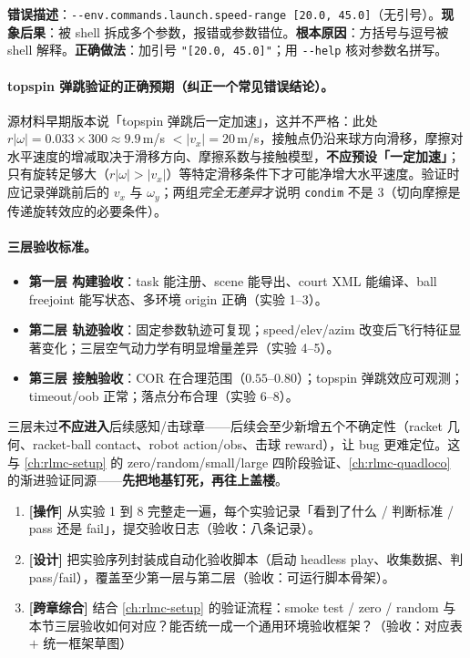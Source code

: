 \begin{pitfall}
\textbf{错误描述}：\verb|--env.commands.launch.speed-range [20.0, 45.0]|（无引号）。\textbf{现象后果}：被 shell 拆成多个参数，报错或参数错位。\textbf{根本原因}：方括号与逗号被 shell 解释。\textbf{正确做法}：加引号 \verb|"[20.0, 45.0]"|；用 \verb|--help| 核对参数名拼写。
\end{pitfall}

\paragraph{topspin 弹跳验证的正确预期（纠正一个常见错误结论）。}源材料早期版本说「topspin 弹跳后一定加速」，这并不严格：此处 $r|\omega|=0.033\times300\approx9.9$\,m/s $<|v_x|=20$\,m/s，接触点仍沿来球方向滑移，摩擦对水平速度的增减取决于滑移方向、摩擦系数与接触模型，\textbf{不应预设「一定加速」}；只有旋转足够大（$r|\omega|>|v_x|$）等特定滑移条件下才可能净增大水平速度。验证时应记录弹跳前后的 $v_x$ 与 $\omega_y$；两组\emph{完全无差异}才说明 \verb|condim| 不是 $3$（切向摩擦是传递旋转效应的必要条件）。

\paragraph{三层验收标准。}
\begin{itemize}
  \item \textbf{第一层 构建验收}：task 能注册、scene 能导出、court XML 能编译、ball freejoint 能写状态、多环境 origin 正确（实验 1--3）。
  \item \textbf{第二层 轨迹验收}：固定参数轨迹可复现；speed/elev/azim 改变后飞行特征显著变化；三层空气动力学有明显增量差异（实验 4--5）。
  \item \textbf{第三层 接触验收}：COR 在合理范围（$0.55$--$0.80$）；topspin 弹跳效应可观测；timeout/oob 正常；落点分布合理（实验 6--8）。
\end{itemize}
三层未过\textbf{不应进入}后续感知/击球章——后续会至少新增五个不确定性（racket 几何、racket-ball contact、robot action/obs、击球 reward），让 bug 更难定位。这与 \cref{ch:rlmc-setup} 的 zero/random/small/large 四阶段验证、\cref{ch:rlmc-quadloco} 的渐进验证同源——\textbf{先把地基钉死，再往上盖楼}。

\begin{practice}[本节动手任务]
\begin{enumerate}
  \item \textbf{[操作]} 从实验 1 到 8 完整走一遍，每个实验记录「看到了什么 / 判断标准 / pass 还是 fail」，提交验收日志（验收：八条记录）。
  \item \textbf{[设计]} 把实验序列封装成自动化验收脚本（启动 headless play、收集数据、判 pass/fail），覆盖至少第一层与第二层（验收：可运行脚本骨架）。
  \item \textbf{[跨章综合]} 结合 \cref{ch:rlmc-setup} 的验证流程：smoke test / zero / random 与本节三层验收如何对应？能否统一成一个通用环境验收框架？（验收：对应表 $+$ 统一框架草图）
\end{enumerate}
\end{practice}

